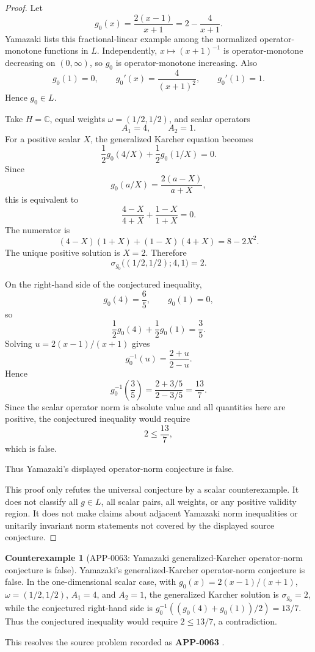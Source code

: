 \documentclass[11pt]{article}
\numberwithin{equation}{section}
\theoremstyle{definition}
\newtheorem{counterexample}[theorem]{Counterexample}
\theoremstyle{remark}
\newcommand{\1}{\mathbf 1}
\begin{document}
\begin{proof}
Let
\[
g_0(x)=\frac{2(x-1)}{x+1}=2-\frac4{x+1}.
\]
Yamazaki lists this fractional-linear example among the normalized operator-monotone functions in \(L\). Independently, \(x\mapsto (x+1)^{-1}\) is operator-monotone decreasing on \((0,\infty)\), so \(g_0\) is operator-monotone increasing. Also
\[
g_0(1)=0,\qquad
g_0'(x)=\frac4{(x+1)^2},\qquad
g_0'(1)=1.
\]
Hence \(g_0\in L\).

Take \(H=\mathbb C\), equal weights \(\omega=(1/2,1/2)\), and scalar operators
\[
A_1=4,\qquad A_2=1.
\]
For a positive scalar \(X\), the generalized Karcher equation becomes
\[
\frac12 g_0(4/X)+\frac12 g_0(1/X)=0.
\]
Since
\[
g_0(a/X)=\frac{2(a-X)}{a+X},
\]
this is equivalent to
\[
\frac{4-X}{4+X}+\frac{1-X}{1+X}=0.
\]
The numerator is
\[
(4-X)(1+X)+(1-X)(4+X)=8-2X^2.
\]
The unique positive solution is \(X=2\). Therefore
\[
\sigma_{g_0}\bigl((1/2,1/2);4,1\bigr)=2.
\]

On the right-hand side of the conjectured inequality,
\[
g_0(4)=\frac65,\qquad g_0(1)=0,
\]
so
\[
\frac12 g_0(4)+\frac12 g_0(1)=\frac35.
\]
Solving \(u=2(x-1)/(x+1)\) gives
\[
g_0^{-1}(u)=\frac{2+u}{2-u}.
\]
Hence
\[
g_0^{-1}\left(\frac35\right)
=\frac{2+3/5}{2-3/5}
=\frac{13}{7}.
\]
Since the scalar operator norm is absolute value and all quantities here are positive, the conjectured inequality would require
\[
2\le \frac{13}{7},
\]
which is false.

Thus Yamazaki's displayed operator-norm conjecture is false.

This proof only refutes the universal conjecture by a scalar counterexample. It does not classify all \(g\in L\), all scalar pairs, all weights, or any positive validity region. It does not make claims about adjacent Yamazaki norm inequalities or unitarily invariant norm statements not covered by the displayed source conjecture.
\end{proof}

\begin{counterexample}[APP-0063: Yamazaki generalized-Karcher operator-norm conjecture is false]
\label{res:yamazaki-gke-operator-norm-conjecture-scalar-counterexample}
Yamazaki's generalized-Karcher operator-norm conjecture is false. In the one-dimensional scalar case, with \(g_0(x)=2(x-1)/(x+1)\), \(\omega=(1/2,1/2)\), \(A_1=4\), and \(A_2=1\), the generalized Karcher solution is \(\sigma_{g_0}=2\), while the conjectured right-hand side is \(g_0^{-1}((g_0(4)+g_0(1))/2)=13/7\). Thus the conjectured inequality would require \(2\le13/7\), a contradiction.



This resolves the source problem recorded as \textbf{APP-0063} \cite{app-app-0063-source}.
\end{counterexample}
\end{document}
